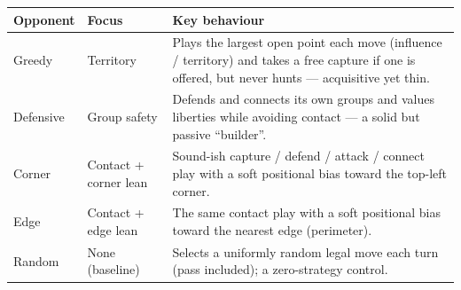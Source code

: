 \begin{table}[t]
  \centering
  \label{tab:opponents}
  \begin{tabular}{@{}llp{}@{}}
    \toprule
    Opponent & Focus & Key behaviour \\
    \midrule
    Greedy    & Territory              & Plays the largest open point each move (influence / territory) and takes a free capture if one is offered, but never hunts --- acquisitive yet thin. \\
    Defensive & Group safety           & Defends and connects its own groups and values liberties while avoiding contact --- a solid but passive ``builder''. \\
    Corner    & Contact + corner lean  & Sound-ish capture / defend / attack / connect play with a soft positional bias toward the top-left corner. \\
    Edge      & Contact + edge lean    & The same contact play with a soft positional bias toward the nearest edge (perimeter). \\
    Random    & None (baseline)        & Selects a uniformly random legal move each turn (pass included); a zero-strategy control. \\
    \bottomrule
  \end{tabular}
\end{table}
